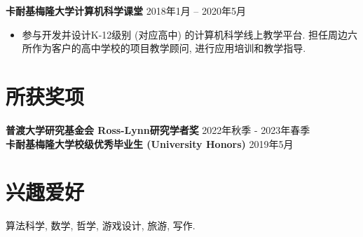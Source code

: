 \documentclass[margin, 10pt]{res-short} %
\begin{document}
\begin{resume}
{\bf 卡耐基梅隆大学\;计算机科学课堂} \hfill 2018年1月 -- 2020年5月
\begin{itemize}
\item 参与开发并设计K-12级别 (对应高中) 的计算机科学线上教学平台. 担任周边六所作为客户的高中学校的项目教学顾问, 进行应用培训和教学指导. 
\end{itemize}



\section{所获奖项}
{\bf 普渡大学研究基金会 Ross-Lynn研究学者奖} \hfill 2022年秋季 - 2023年春季\\
{\bf 卡耐基梅隆大学校级优秀毕业生 (University Honors)} \hfill 2019年5月

\section{兴趣爱好} 算法科学, 数学, 哲学, 游戏设计, 旅游, 写作.


\end{resume}
\end{document}
